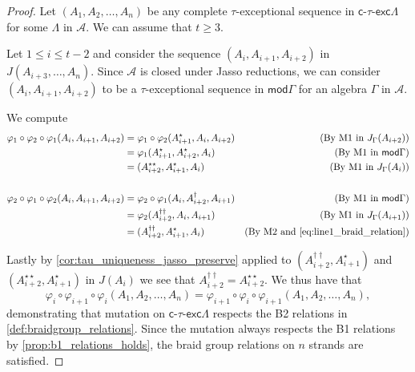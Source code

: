 \documentclass[10pt,a4paper]{amsart}
\newcommand{\ctauexc}[1]{\ensuremath{\mathsf{c}\text{-}\tau\text{-}\mathsf{exc} #1}}
\newcommand{\mods}{\mathsf{mod}}
\begin{document}
\begin{proof}
    Let $(A_1,A_2,\dots,A_n)$ be any complete $\tau$-exceptional sequence in $\ctauexc{\Lambda}$ for some $\Lambda$ in $\mathcal{A}$. We can assume that $t\geq 3$.

    Let $1 \leq i \leq t-2$ and consider the sequence $(A_i,A_{i+1},A_{i+2})$ in $J(A_{i+3},\dots,A_n)$. Since $\mathcal{A}$ is closed under Jasso reductions, we can consider $(A_i,A_{i+1},A_{i+2})$ to be a $\tau$-exceptional sequence in $\mods \Gamma$ for an algebra $\Gamma$ in $\mathcal{A}$. 

    We compute \begin{align}
        \varphi_1\circ \varphi_2 \circ \varphi_1(A_i,A_{i+1},A_{i+2}) &= \varphi_1 \circ \varphi_2(A^\star_{i+1},A_i,A_{i+2}) & \text{(By M1 in $J_\Gamma(A_{i+2})$)} \label{eq:line1_braid_relation}\\
        &= \varphi_1(A^\star_{i+1},A^\star_{i+2},A_i) & \text{(By M1 in $\mods \Gamma$)}\\
        &= (A^{\star\star}_{i+2},A^\star_{i+1},A_i) & \text{(By M1 in $J_\Gamma(A_{i})$)} \\ \notag \\
        \varphi_2\circ \varphi_1 \circ \varphi_2(A_i,A_{i+1},A_{i+2}) &= \varphi_2 \circ \varphi_1(A_{i},A^\dagger_{i+2},A_{i+1}) & \text{(By M1 in $\mods \Gamma$)}\\
        &= \varphi_2(A^{\dagger\dagger}_{i+2},A_{i},A_{i+1}) & \text{(By M1 in $J_\Gamma(A_{i+1})$)}\\
        &= (A^{\dagger\dagger}_{i+2},A^\star_{i+1},A_i) & \text{(By M2 and \cref{eq:line1_braid_relation})}
    \end{align} 


    
    Lastly by \cref{cor:tau_uniqueness_jasso_preserve} applied to $(A^{\dagger\dagger}_{i+2},A^\star_{i+1})$ and $(A^{\star\star}_{i+2},A^\star_{i+1})$ in $J(A_i)$ we see that $A^{\dagger\dagger}_{i+2} = A^{\star\star}_{i+2}$. We thus have that \[\varphi_i\circ \varphi_{i+1} \circ \varphi_i(A_1,A_2,\dots,A_n) = \varphi_{i+1} \circ \varphi_i \circ \varphi_{i+1}(A_1,A_2,\dots,A_n),\] demonstrating that mutation on $\ctauexc{\Lambda}$ respects the B2 relations in \cref{def:braidgroup_relations}. Since the mutation always respects the B1 relations by \cref{prop:b1_relations_holds}, the braid group relations on $n$ strands are satisfied.
\end{proof}
\end{document}
